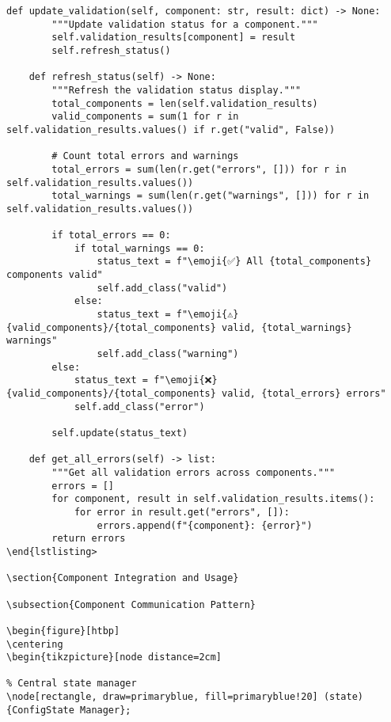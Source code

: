 \documentclass[11pt,a4paper]{article}
\newcommand{\emoji}[1]{{\emojifont #1}}
\begin{document}
\begin{lstlisting}[caption={ConfigPreview Implementation}]
    def update_validation(self, component: str, result: dict) -> None:
        """Update validation status for a component."""
        self.validation_results[component] = result
        self.refresh_status()
        
    def refresh_status(self) -> None:
        """Refresh the validation status display."""
        total_components = len(self.validation_results)
        valid_components = sum(1 for r in self.validation_results.values() if r.get("valid", False))
        
        # Count total errors and warnings
        total_errors = sum(len(r.get("errors", [])) for r in self.validation_results.values())
        total_warnings = sum(len(r.get("warnings", [])) for r in self.validation_results.values())
        
        if total_errors == 0:
            if total_warnings == 0:
                status_text = f"\emoji{✅} All {total_components} components valid"
                self.add_class("valid")
            else:
                status_text = f"\emoji{⚠} {valid_components}/{total_components} valid, {total_warnings} warnings"
                self.add_class("warning")
        else:
            status_text = f"\emoji{❌} {valid_components}/{total_components} valid, {total_errors} errors"
            self.add_class("error")
            
        self.update(status_text)
        
    def get_all_errors(self) -> list:
        """Get all validation errors across components."""
        errors = []
        for component, result in self.validation_results.items():
            for error in result.get("errors", []):
                errors.append(f"{component}: {error}")
        return errors
\end{lstlisting>

\section{Component Integration and Usage}

\subsection{Component Communication Pattern}

\begin{figure}[htbp]
\centering
\begin{tikzpicture}[node distance=2cm]

% Central state manager
\node[rectangle, draw=primaryblue, fill=primaryblue!20] (state) {ConfigState Manager};


\end{lstlisting}
\end{document}
